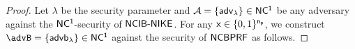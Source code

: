 \begin{proof}
	Let $\lambda$ be the security parameter and $\mathcal{A} = \{{\mathsf{adv}}_\lambda\} \in \mathsf{NC^1}$ be any adversary against the $\mathsf{NC^1}$-security of $\mathsf{NCIB\text{-}NIKE}$. For any $\mathsf{x} \in \{0, 1\}^{\mathsf{n_p}}$, we construct $\advB=\{\advb\} \in \ncone$ against the security of $\mathsf{NCBPRF}$ as follows.



\end{proof}
